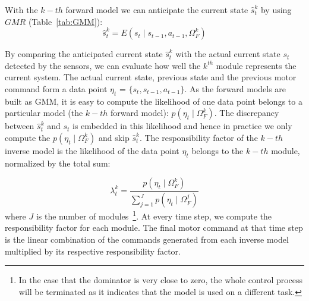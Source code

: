 With the $k-{th}$ forward model we can anticipate the current state ${\hat{s}} ^k_t$ by using $GMR$ (Table~\ref{tab:GMM}):
\begin{equation}
\label{e3}
{\hat{s}} ^k_{t} = E\left({s_t {\mid} s_{t-1}, a_{t-1}, \Omega^k_F}\right)
\end{equation}

By comparing the anticipated current state ${\hat{s}} ^k_t$ with the
actual current state $s_t$ detected by the sensors, we can evaluate
how well the $k^{th}$ module represents the current system. The actual
current state, previous state and the previous motor command form a
data point $\eta_t$ = $\{s_t,s_{t-1},a_{t-1}\}$. As the forward models
are built as GMM, it is easy to compute the likelihood of one data
point belongs to a particular model (the $k-th$ forward model): $p(\eta_t {\mid}
\Omega_F^k)$. The discrepancy between $\hat{s}^k_t$ and $s_t$ is
embedded in this likelihood and hence in practice we only compute the
$p(\eta_t {\mid} \Omega_F^k)$ and skip ${\hat{s}} ^k_t$.  The
responsibility factor of the $k-{th}$ inverse model is the likelihood of
the data point $\eta_t$ belongs to the $k-{th}$ module, normalized by
the total sum:

\begin{equation}
\label{equ:lambda}
\lambda^k_t = \frac{p(\eta_t {\mid} \Omega_F^k)}{\sum_{j=1}^{J}{p(\eta_t {\mid} \Omega_F^j)}}
\end{equation}
where $J$ is the number of modules~\footnote{In the case that the
  dominator is very close to zero, the whole control process will be
  terminated as it indicates that the model is used on a different
  task.}.  At every time step, we compute the responsibility factor
for each module. The final motor command at that time step is the
linear combination of the commands generated from each inverse model
multiplied by its respective responsibility factor.


